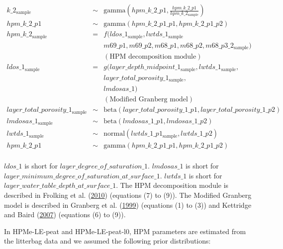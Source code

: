 \documentclass[
  12pt,
]{article}
\begin{document}
\begin{equation}
\begin{aligned}
k\_2_{\text{sample}} & \sim & \text{gamma}\left(hpm\_k\_2\_p1, \frac{hpm\_k\_2\_p1}{hpm\_k\_2_{\text{sample}}} \right)\\
hpm\_k\_2\_p1 & \sim & \text{gamma}(hpm\_k\_2\_p1\_p1, hpm\_k\_2\_p1\_p2)\\
hpm\_k\_2_{\text{sample}} & = & f(ldos\_1_{\text{sample}}, lwtds\_1_{\text{sample}}\\
          && m69\_p1, m69\_p2, m68\_p1, m68\_p2, m68\_p3\_2_{\text{sample}})\\
          && (\text{HPM decomposition module})\\
ldos\_1_{\text{sample}} & = & g(layer\_depth\_midpoint\_1_{\text{sample}},
        lwtds\_1_{\text{sample}},\\
          && layer\_total\_porosity\_1_{\text{sample}},\\
          && lmdosas\_1)\\
          && (\text{Modified Granberg model})\\
layer\_total\_porosity\_1_{\text{sample}} & \sim & \text{beta}(layer\_total\_porosity\_1\_p1, layer\_total\_porosity\_1\_p2)\\
lmdosas\_1_{\text{sample}} & \sim & \text{beta}(lmdosas\_1\_p1, lmdosas\_1\_p2)\\
lwtds\_1_{\text{sample}} & \sim & \text{normal}(lwtds\_1\_p1_{\text{sample}}, lwtds\_1\_p2)\\
hpm\_k\_2\_p1 & \sim & \text{gamma}(hpm\_k\_2\_p1\_p1, hpm\_k\_2\_p1\_p2)\\
\label{eq:sup-model-1}
\end{aligned}
\end{equation}

\(ldos\_1\) is short for \(layer\_degree\_of\_saturation\_1\). \(lmdosas\_1\) is short for \(layer\_minimum\_degree\_of\_saturation\_at\_surface\_1\). \(lwtds\_1\) is short for \(layer\_water\_table\_depth\_at\_surface\_1\). The HPM decomposition module is described in Frolking et al. (\protect\hyperlink{ref-Frolking.2010}{2010}) (equations (7) to (9)). The Modified Granberg model is described in Granberg et al. (\protect\hyperlink{ref-Granberg.1999}{1999}) (equations (1) to (3)) and Kettridge and Baird (\protect\hyperlink{ref-Kettridge.2007}{2007}) (equations (6) to (9)).

In HPMe-LE-peat and HPMe-LE-peat-l0, HPM parameters are estimated from the litterbag data and we assumed the following prior distributions:
\end{document}
